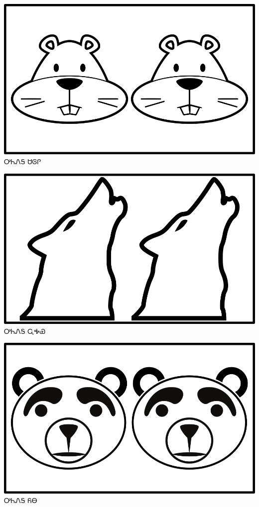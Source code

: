\documentclass[avery5371]{flashcards}%
\begin{document}
\begin{flashcard}{
\includegraphics[width=0.95\columnwidth,height=.51\columnwidth,keepaspectratio]{../artwork/objects-animate/anitali-saloli}
}\Huge ᎤᏂᏁᎦ ᏌᎶᎵ
\end{flashcard}

\begin{flashcard}{
\includegraphics[width=0.95\columnwidth,height=.51\columnwidth,keepaspectratio]{../artwork/objects-animate/anitali-wahya}
}\Huge ᎤᏂᏁᎦ ᏩᎭᏯ
\end{flashcard}

\begin{flashcard}{
\includegraphics[width=0.95\columnwidth,height=.51\columnwidth,keepaspectratio]{../artwork/objects-animate/anitali-yona}
}\Huge ᎤᏂᏁᎦ ᏲᎾ
\end{flashcard}
\end{document}
